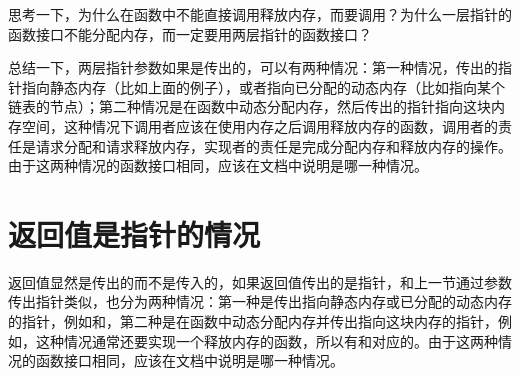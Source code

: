 

思考一下，为什么在函数中不能直接调用释放内存，而要调用？为什么一层指针的函数接口不能分配内存，而一定要用两层指针的函数接口？



总结一下，两层指针参数如果是传出的，可以有两种情况：第一种情况，传出的指针指向静态内存（比如上面的例子），或者指向已分配的动态内存（比如指向某个链表的节点）；第二种情况是在函数中动态分配内存，然后传出的指针指向这块内存空间，这种情况下调用者应该在使用内存之后调用释放内存的函数，调用者的责任是请求分配和请求释放内存，实现者的责任是完成分配内存和释放内存的操作。由于这两种情况的函数接口相同，应该在文档中说明是哪一种情况。




\section{返回值是指针的情况}
%
返回值显然是传出的而不是传入的，如果返回值传出的是指针，和上一节通过参数传出指针类似，也分为两种情况：第一种是传出指向静态内存或已分配的动态内存的指针，例如和，第二种是在函数中动态分配内存并传出指向这块内存的指针，例如，这种情况通常还要实现一个释放内存的函数，所以有和对应的。由于这两种情况的函数接口相同，应该在文档中说明是哪一种情况。


